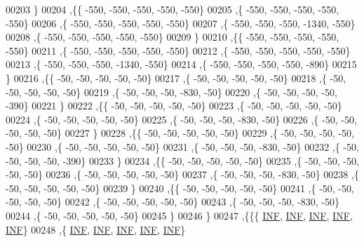 \begin{DoxyCode}
00203   \}
00204  ,\{\{  -550,  -550,  -550,  -550,  -550\}
00205   ,\{  -550,  -550,  -550,  -550,  -550\}
00206   ,\{  -550,  -550,  -550,  -550,  -550\}
00207   ,\{  -550,  -550,  -550, -1340,  -550\}
00208   ,\{  -550,  -550,  -550,  -550,  -550\}
00209   \}
00210  ,\{\{  -550,  -550,  -550,  -550,  -550\}
00211   ,\{  -550,  -550,  -550,  -550,  -550\}
00212   ,\{  -550,  -550,  -550,  -550,  -550\}
00213   ,\{  -550,  -550,  -550, -1340,  -550\}
00214   ,\{  -550,  -550,  -550,  -550,  -890\}
00215   \}
00216  ,\{\{   -50,   -50,   -50,   -50,   -50\}
00217   ,\{   -50,   -50,   -50,   -50,   -50\}
00218   ,\{   -50,   -50,   -50,   -50,   -50\}
00219   ,\{   -50,   -50,   -50,  -830,   -50\}
00220   ,\{   -50,   -50,   -50,   -50,  -390\}
00221   \}
00222  ,\{\{   -50,   -50,   -50,   -50,   -50\}
00223   ,\{   -50,   -50,   -50,   -50,   -50\}
00224   ,\{   -50,   -50,   -50,   -50,   -50\}
00225   ,\{   -50,   -50,   -50,  -830,   -50\}
00226   ,\{   -50,   -50,   -50,   -50,   -50\}
00227   \}
00228  ,\{\{   -50,   -50,   -50,   -50,   -50\}
00229   ,\{   -50,   -50,   -50,   -50,   -50\}
00230   ,\{   -50,   -50,   -50,   -50,   -50\}
00231   ,\{   -50,   -50,   -50,  -830,   -50\}
00232   ,\{   -50,   -50,   -50,   -50,  -390\}
00233   \}
00234  ,\{\{   -50,   -50,   -50,   -50,   -50\}
00235   ,\{   -50,   -50,   -50,   -50,   -50\}
00236   ,\{   -50,   -50,   -50,   -50,   -50\}
00237   ,\{   -50,   -50,   -50,  -830,   -50\}
00238   ,\{   -50,   -50,   -50,   -50,   -50\}
00239   \}
00240  ,\{\{   -50,   -50,   -50,   -50,   -50\}
00241   ,\{   -50,   -50,   -50,   -50,   -50\}
00242   ,\{   -50,   -50,   -50,   -50,   -50\}
00243   ,\{   -50,   -50,   -50,  -830,   -50\}
00244   ,\{   -50,   -50,   -50,   -50,   -50\}
00245   \}
00246  \}
00247 ,\{\{\{   \mbox{\hyperlink{1_88_84__epars_8h_a12c2040f25d8e3a7b9e1c2024c618cb6}{INF}},   \mbox{\hyperlink{1_88_84__epars_8h_a12c2040f25d8e3a7b9e1c2024c618cb6}{INF}},   \mbox{\hyperlink{1_88_84__epars_8h_a12c2040f25d8e3a7b9e1c2024c618cb6}{INF}},   \mbox{\hyperlink{1_88_84__epars_8h_a12c2040f25d8e3a7b9e1c2024c618cb6}{INF}},   \mbox{\hyperlink{1_88_84__epars_8h_a12c2040f25d8e3a7b9e1c2024c618cb6}{INF}}\}
00248   ,\{   \mbox{\hyperlink{1_88_84__epars_8h_a12c2040f25d8e3a7b9e1c2024c618cb6}{INF}},   \mbox{\hyperlink{1_88_84__epars_8h_a12c2040f25d8e3a7b9e1c2024c618cb6}{INF}},   \mbox{\hyperlink{1_88_84__epars_8h_a12c2040f25d8e3a7b9e1c2024c618cb6}{INF}},   \mbox{\hyperlink{1_88_84__epars_8h_a12c2040f25d8e3a7b9e1c2024c618cb6}{INF}},   \mbox{\hyperlink{1_88_84__epars_8h_a12c2040f25d8e3a7b9e1c2024c618cb6}{INF}}\}

\end{DoxyCode}
